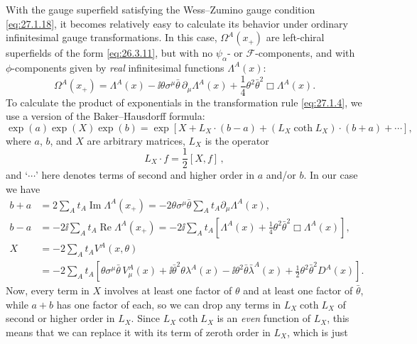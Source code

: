 With the gauge superfield satisfying the Wess--Zumino gauge condition
\eqref{eq:27.1.18}, it becomes relatively easy to calculate its behavior
under ordinary infinitesimal gauge transformations. In this case,
\(\Omega^A(x_+)\) are left-chiral superfields of the form
\eqref{eq:26.3.11}, but with no \(\psi_\alpha\)- or
\(\mathcal{F}\)-components, and with \(\phi\)-components given by
\textit{real} infinitesimal functions \(\Lambda^A(x)\):
\begin{equation}
  \Omega^A(x_+)=\Lambda^A(x)
  -\ii\theta\sigma^\mu\bar\theta\,\partial_\mu\Lambda^A(x)
  +\frac14\theta^2\bar\theta^2\Box\Lambda^A(x).
  \tag{27.1.20}\label{eq:27.1.20}
\end{equation}
To calculate the product of exponentials in the transformation rule
\eqref{eq:27.1.4}, we use a version of the Baker--Hausdorff formula:
\begin{equation}
  \exp(a)\exp(X)\exp(b)
  =\exp\left[
    X+L_X\mathbin{\cdot}(b-a)
    +(L_X\coth L_X)\mathbin{\cdot}(b+a)+\cdots
  \right],
  \tag{27.1.21}\label{eq:27.1.21}
\end{equation}
where \(a\), \(b\), and \(X\) are arbitrary matrices, \(L_X\) is the
operator
\begin{equation}
  L_X\mathbin{\cdot} f=\frac12[X,f]\,,
  \tag{27.1.22}\label{eq:27.1.22}
\end{equation}
and `\(\cdots\)' here denotes terms of second and higher order in \(a\)
and/or \(b\). In our case we have
\[
  \begin{aligned}
  b+a
  &=2\sum_A t_A\operatorname{Im}\Lambda^A(x_+)
   =-2\theta\sigma^\mu\bar\theta
     \sum_A t_A\partial_\mu\Lambda^A(x),
  \\
  b-a
  &=-2\ii\sum_A t_A\operatorname{Re}\Lambda^A(x_+)
   =-2\ii\sum_A t_A\left[
     \Lambda^A(x)+\frac14\theta^2\bar\theta^2
     \Box\Lambda^A(x)
   \right],
  \\
  X
  &=-2\sum_A t_AV^A(x,\theta)
  \\
  &=-2\sum_A t_A\left[
     \theta\sigma^\mu\bar\theta\,V^A_\mu(x)
     +\ii\bar\theta^2\theta\lambda^A(x)
     -\ii\theta^2\bar\theta\bar\lambda^A(x)
     +\frac12\theta^2\bar\theta^2D^A(x)
   \right].
  \end{aligned}
\]
Now, every term in \(X\) involves at least one factor of \(\theta\) and
at least one factor of \(\bar\theta\), while \(a+b\) has one factor of
each, so we can drop any terms in
\(L_X\coth L_X\) of second or higher order in \(L_X\). Since
\(L_X\coth L_X\) is an \textit{even} function of \(L_X\), this means that
we can replace it with its term of zeroth order in \(L_X\), which is just
